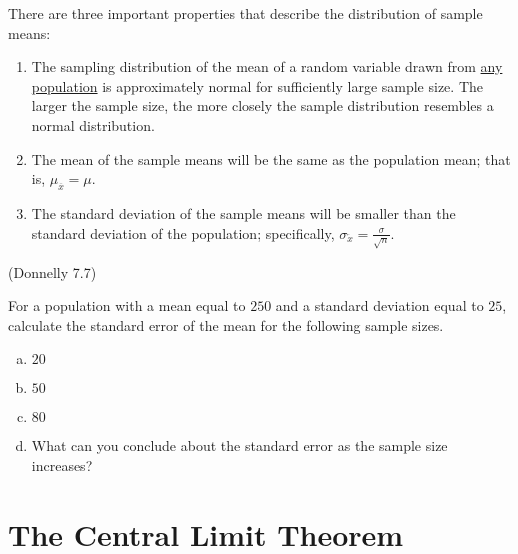 \documentclass[12pt, letterpaper]{article}
\newcounter{exercise}
\theoremstyle{definition}
\begin{document}
\noindent There are three important properties that describe the distribution of sample means:

\begin{enumerate}

\item The sampling distribution of the mean of a random variable drawn from \underline{any population} is approximately normal for sufficiently large sample size.  The larger the sample size, the more closely the sample distribution resembles a normal distribution.

\item The mean of the sample means will be the same as the population mean;  that is, $\mu_{\overline{x}}=\mu$.

\item The standard deviation of the sample means will be smaller than the standard deviation of the population;  specifically, $\sigma_{\overleftarrow{x}}=\frac{\sigma}{\sqrt{n}}$.

\end{enumerate}


\begin{exercise}  (Donnelly 7.7)

For a population with a mean equal to $250$ and a standard deviation equal to $25$, calculate the standard error of the mean for the following sample sizes.

\end{exercise}

\begin{enumerate}[(a)]

\item $20$

\vfill

\item $50$

\vfill

\item $80$

\vfill

\item What can you conclude about the standard error as the sample size increases?

\vfill

\end{enumerate}

\newpage


\section*{The Central Limit Theorem}
\end{document}
